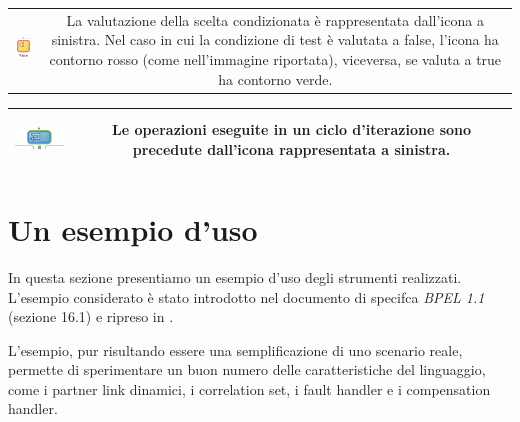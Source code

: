 \begin{tabular}{c c}
\hline
\parbox[c][3.5cm][c]{0.2 \textwidth}{
\begin{center} 
\includegraphics[scale=0.7]{blide/dia/BlideIf}
\end{center}
} & 
\parbox[c][3.5cm][c]{0.6 \textwidth}{La valutazione della scelta condizionata
è rappresentata dall'icona a sinistra. Nel caso in cui la condizione di test
è valutata a false, l'icona ha contorno rosso (come nell'immagine
riportata), viceversa, se valuta a true ha contorno verde.}\\
\end{tabular}

\begin{tabular}{c c}
\hline
\parbox[c][2.5cm][c]{0.2 \textwidth}{
\begin{center} 
\includegraphics[scale=0.7]{blide/dia/BlideWhile}
\end{center}
} & 
\parbox[c][2.5cm][c]{0.6 \textwidth}{Le operazioni eseguite in un ciclo
d'iterazione sono precedute dall'icona rappresentata a sinistra.}\\
\hline
\end{tabular}


\vspace{0.5cm}
\section{Un esempio d'uso}

In questa sezione presentiamo un esempio d'uso degli strumenti
realizzati. L'esempio considerato è stato introdotto nel documento di specifca
\emph{BPEL 1.1} \cite{BPEL11Spec} (sezione 16.1) e ripreso in
\cite{LaPuTie1}.

L'esempio, pur risultando essere una semplificazione di uno scenario reale,
permette di sperimentare un buon numero delle caratteristiche del linguaggio,	
come i partner link dinamici, i correlation set, i fault handler e i
compensation handler.
\\

